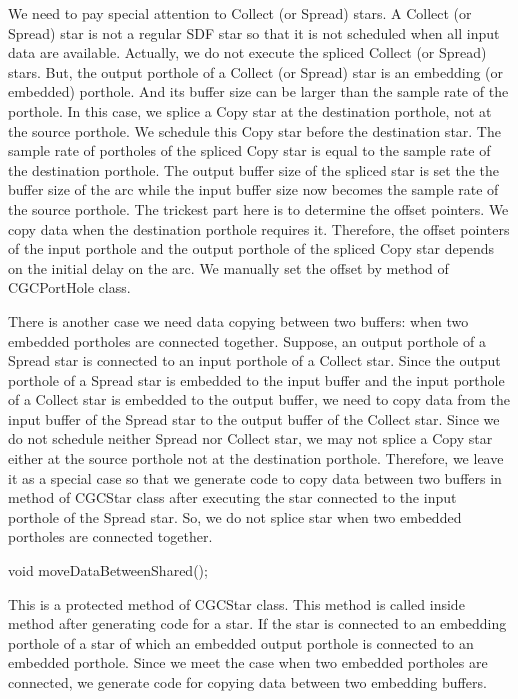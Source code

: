 We need to pay special attention to Collect (or Spread) stars. A Collect
(or Spread) star is not a regular SDF star so that it is not 
scheduled when all input data are available. Actually, we do not execute 
the spliced Collect (or Spread) stars.
But, the output porthole of a Collect (or Spread) star is an embedding
(or embedded) porthole. And
its buffer size can be larger than the sample rate of the porthole.
In this case, we splice a Copy star at the destination porthole, not
at the source porthole. We schedule this Copy star before the destination
star. The sample rate of portholes of the spliced Copy star is equal to
the sample rate of the destination porthole. The output buffer size
of the spliced star is set the the buffer size of the arc while the input
buffer size now becomes the sample rate of the source porthole. The
trickest part here is to determine the offset pointers. We copy data 
when the destination porthole requires it. Therefore, the offset pointers of
the input porthole and the output porthole of the spliced Copy star
depends on the initial delay on the arc. We manually set the offset by
 method of CGCPortHole class.

There is another case we need data copying between two buffers: when
two embedded portholes are connected together. Suppose, an output porthole
of a Spread star is connected to an input porthole of a Collect star.
Since the output porthole of a Spread star is embedded to the input buffer
and the input porthole of a Collect star is embedded to the output buffer,
we need to copy data from the input buffer of the Spread star to the output
buffer of the Collect star. Since we do not schedule neither Spread nor
Collect star, we may not splice a Copy star either at the source porthole
not at the destination porthole. Therefore, we leave it as a special case
so that we generate code to copy data between two buffers in
 method of CGCStar class after executing the
star connected to the input porthole of the Spread star. So, we do not
splice star when two embedded portholes are connected together.

\begin{example}
void moveDataBetweenShared();
\end{example}

This is a protected method of CGCStar class. This method is called inside
 method after generating code for a star. If the star is
connected to an embedding porthole of a star of which an embedded output 
porthole is connected to an embedded porthole. Since we meet the case
when two embedded portholes are connected, we generate code for copying
data between two embedding buffers.

